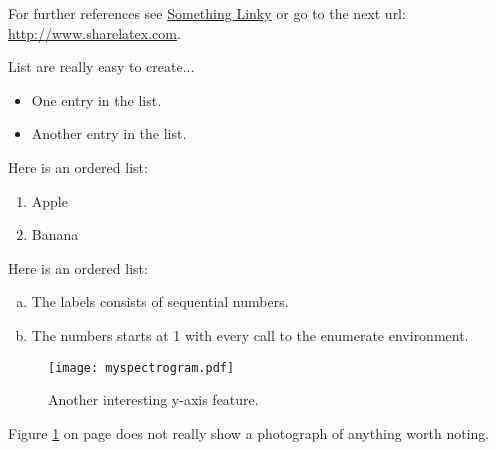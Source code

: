 \documentclass[journal,comsoc]{IEEEtran}
\begin{document}
\lipsum[1]

For further references see \href{http://www.sharelatex.com}{Something Linky} or go to the next url: \url{http://www.sharelatex.com}.

List are really easy to create...
 
\begin{itemize}
  \item One entry in the list.
  \item Another entry in the list.
\end{itemize}

Here is an ordered list:

\begin{enumerate}[(1)] %
\item Apple
\item Banana
\end{enumerate}

Here is an ordered list:

\begin{enumerate}[(a)]
  \item The labels consists of sequential numbers.
  \item The numbers starts at 1 with every call to the enumerate environment.
\end{enumerate}

\lipsum[1]

\begin{figure}[thb]
	\centering  
	\texttt{[image: myspectrogram.pdf]}
	\caption{Another interesting y-axis feature.}
	\label{fig:specgram}
\end{figure}

Figure \ref{fig:specgram} on page \pageref{fig:specgram} does not really show a photograph of anything worth noting.  \lipsum
\end{document}
